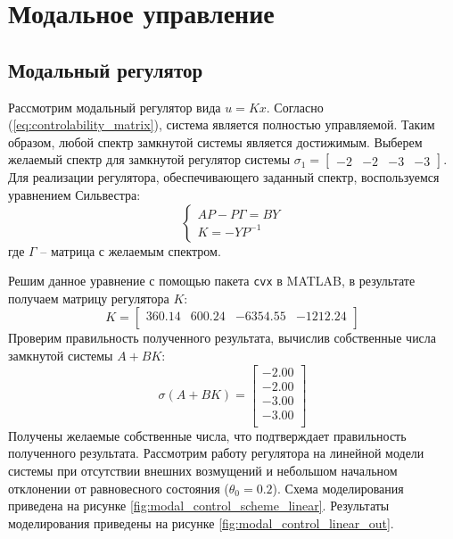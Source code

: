 \section{Модальное управление}
\subsection{Модальный регулятор}
Рассмотрим модальный регулятор вида $u = Kx$. Согласно (\ref{eq:controlability_matrix}), система является 
полностью управляемой. Таким образом, любой спектр замкнутой системы является достижимым. 
Выберем желаемый спектр для замкнутой регулятор системы $\sigma_1 = \begin{bmatrix}-2 & -2 & -3 & -3\end{bmatrix}$. 
Для реализации регулятора, обеспечивающего заданный спектр, воспользуемся уравнением Сильвестра: 
\begin{equation}
    \begin{cases}
        AP - P\Gamma = BY \\
        K = -YP^{-1} 
    \end{cases}
\end{equation}
где $\Gamma$ -- матрица с желаемым спектром. 

Решим данное уравнение с помощью пакета \texttt{cvx} в MATLAB, в результате получаем матрицу регулятора $K$:
\begin{equation}
    K = \begin{bmatrix}
    360.14  & 600.24  & -6354.55  & -1212.24 \\ 
    \end{bmatrix}
\end{equation} 
Проверим правильность полученного результата, вычислив собственные числа замкнутой системы $A + BK$: 
\begin{equation}
    \sigma(A + BK) = \begin{bmatrix}
    -2.00 \\ 
    -2.00 \\ 
    -3.00 \\ 
    -3.00 \\ 
    \end{bmatrix}
\end{equation}
Получены желаемые собственные числа, что подтверждает правильность полученного результата. 
Рассмотрим работу регулятора на линейной модели системы при отсутствии внешних возмущений и 
небольшом начальном отклонении от равновесного состояния ($\theta_0 = 0.2$). Схема моделирования приведена на 
рисунке \ref{fig:modal_control_scheme_linear}. Результаты моделирования приведены на 
рисунке \ref{fig:modal_control_linear_out}.

